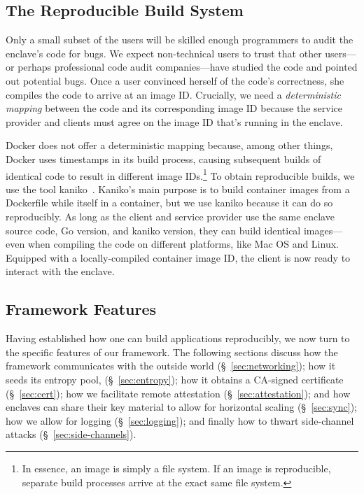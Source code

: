 \subsection{The Reproducible Build System}
\label{sec:build-system}

Only a small subset of the users will be skilled enough programmers to audit the enclave's code for bugs.  We expect non-technical users to trust that other users---or perhaps professional code audit companies---have studied the code and pointed out potential bugs.  Once a user convinced herself of the code's correctness, she compiles the code to arrive at an image ID.  Crucially, we need a \emph{deterministic mapping} between the code and its corresponding image ID because the service provider and clients must agree on the image ID that's running in the enclave.

Docker does not offer a deterministic mapping because, among other things, Docker uses timestamps in its build process, causing subsequent builds of identical code to result in different image IDs.\footnote{In essence, an image is simply a file system.  If an image is reproducible, separate build processes arrive at the exact same file system.}  To obtain reproducible builds, we use the tool kaniko~\cite{kaniko}.  Kaniko's main purpose is to build container images from a Dockerfile while itself in a container, but we use kaniko because it can do so reproducibly.  As long as the client and service provider use the same enclave source code, Go version, and kaniko version, they can build identical images---even when compiling the code on different platforms, like Mac OS and Linux.  Equipped with a locally-compiled container image ID, the client is now ready to interact with the enclave.

\subsection{Framework Features}
\label{sec:framework}

Having established how one can build applications reproducibly, we now turn to the specific features of our framework.  The following sections discuss how the framework communicates with the outside world (\S~\ref{sec:networking});
how it seeds its entropy pool, (\S~\ref{sec:entropy});
how it obtains a CA-signed certificate (\S~\ref{sec:cert});
how we facilitate remote attestation (\S~\ref{sec:attestation});
and how enclaves can share their key material to allow for horizontal scaling (\S~\ref{sec:sync});
how we allow for logging (\S~\ref{sec:logging});
and finally how to thwart side-channel attacks (\S~\ref{sec:side-channels}).

